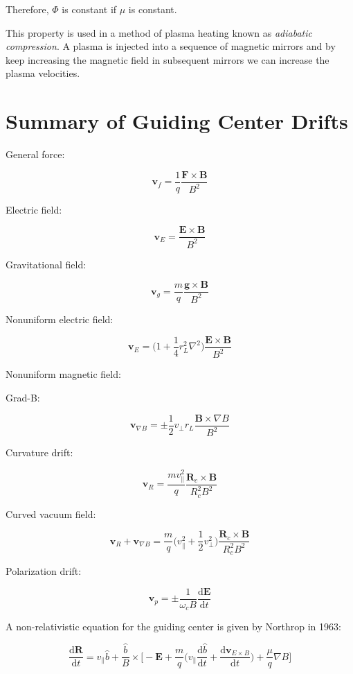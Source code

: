 \documentclass[
  notoc %
]{tufte-book}
\begin{document}
Therefore, \(\Phi\) is constant if \(\mu\) is constant.

This property is used in a method of plasma heating known as
\emph{adiabatic compression}. A plasma is injected into a sequence of
magnetic mirrors and by keep increasing the magnetic field in subsequent
mirrors we can increase the plasma velocities.

\hypertarget{summary-of-guiding-center-drifts}{%
\section{Summary of Guiding Center
Drifts}\label{summary-of-guiding-center-drifts}}

General force:

\[
\mathbf{v}_f = \frac{1}{q}\frac{\mathbf{F}\times\mathbf{B}}{B^2}
\]

Electric field:

\[
\mathbf{v}_E = \frac{\mathbf{E}\times\mathbf{B}}{B^2}
\]

Gravitational field:

\[
\mathbf{v}_g = \frac{m}{q}\frac{\mathbf{g}\times\mathbf{B}}{B^2}
\]

Nonuniform electric field:

\[
\mathbf{v}_E = \Big( 1+\frac{1}{4}r_L^2 \nabla^2 \Big)\frac{\mathbf{E}\times\mathbf{B}}{B^2}
\]

Nonuniform magnetic field:

Grad-B:

\[
\mathbf{v}_{\nabla B} = \pm \frac{1}{2}v_\perp r_L\frac{\mathbf{B}\times\nabla B}{B^2}
\]

Curvature drift:

\[
\mathbf{v}_R = \frac{mv_\parallel^2}{q}\frac{\mathbf{R}_c \times\mathbf{B}}{R_c^2 B^2}
\]

Curved vacuum field:

\[
\mathbf{v}_R + \mathbf{v}_{\nabla B} = \frac{m}{q}\Big( v_\parallel^2 + \frac{1}{2}v_\perp^2 \Big) \frac{\mathbf{R}_c \times\mathbf{B}}{R_c^2 B^2}
\]

Polarization drift:

\[
\mathbf{v}_p = \pm \frac{1}{\omega_c B}\frac{\mathrm{d}\mathbf{E}}{\mathrm{d}t}
\]

A non-relativistic equation for the guiding center is given by Northrop
in 1963:

\[
\frac{\mathrm{d}\mathbf{R}}{\mathrm{d}t} = v_\parallel\hat{b} + \frac{\hat{b}}{B}\times \Big[ -\mathbf{E} + \frac{m}{q}\Big( v_\parallel\frac{\mathrm{d}\hat{b}}{\mathrm{d}t} + \frac{\mathrm{d}\mathbf{v}_{E\times B}}{\mathrm{d}t} \Big) + \frac{\mu}{q}\nabla B \Big]
\]
\end{document}
